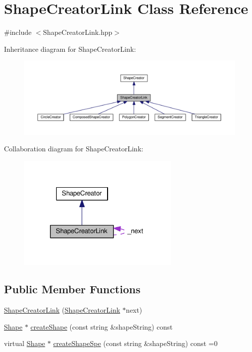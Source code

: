 \hypertarget{class_shape_creator_link}{}\section{Shape\+Creator\+Link Class Reference}
\label{class_shape_creator_link}


{\ttfamily \#include $<$Shape\+Creator\+Link.\+hpp$>$}



Inheritance diagram for Shape\+Creator\+Link\+:\nopagebreak
\begin{figure}[H]
\begin{center}
\leavevmode
\includegraphics[width=350pt]{class_shape_creator_link__inherit__graph}
\end{center}
\end{figure}


Collaboration diagram for Shape\+Creator\+Link\+:\nopagebreak
\begin{figure}[H]
\begin{center}
\leavevmode
\includegraphics[width=221pt]{class_shape_creator_link__coll__graph}
\end{center}
\end{figure}
\subsection*{Public Member Functions}
\begin{DoxyCompactItemize}
\item 
\hyperlink{class_shape_creator_link_a625ba24fc48628d42ddd206e65489de0}{Shape\+Creator\+Link} (\hyperlink{class_shape_creator_link}{Shape\+Creator\+Link} $\ast$next)
\item 
\hyperlink{class_shape}{Shape} $\ast$ \hyperlink{class_shape_creator_link_af372255e987c8fa587620e16dd406ccc}{create\+Shape} (const string \&shape\+String) const
\item 
virtual \hyperlink{class_shape}{Shape} $\ast$ \hyperlink{class_shape_creator_link_a036ecc845946d23b36335e9077308bcf}{create\+Shape\+Spe} (const string \&shape\+String) const =0
\end{DoxyCompactItemize}
